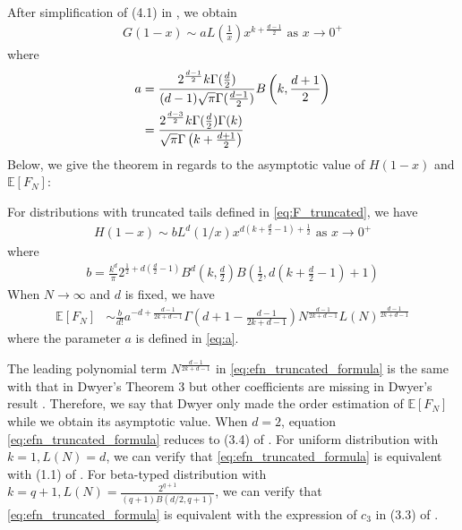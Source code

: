 \documentclass{aptpub}
\def\E{\mathbb{E}}
\begin{document}
After simplification of (4.1) in \cite{dwyer1991convex}, we obtain
\begin{align}
    G(1-x) \sim a
    L\left(\frac{1}{x} \right)
    x^{k+\frac{d-1}{2}} \textrm{ as } x \to 0^+ 
    \label{eq:truncated_G_1_x}
\end{align}
where
\begin{align}
a &=\frac{2^{\frac{d-1}{2}} k \Gamma(\frac{d}{2})}
    {(d-1) \sqrt{\pi} \Gamma(\frac{d-1}{2})}
    B\left(k, \frac{d+1}{2}\right) \notag \\
    &= \frac{2^{\frac{d-3}{2}} k \Gamma(\frac{d}{2})\Gamma(k)}
    {\sqrt{\pi} \Gamma\left(k+\frac{d+1}{2}\right)}
    \label{eq:a}
\end{align}
Below, we give the theorem in regards to the asymptotic value of $H(1-x)$ and $\E[F_N]$:
\begin{theorem}\label{thm:truncated_tails}
     For distributions with truncated tails
     defined in \eqref{eq:F_truncated},
     we have
\begin{align}
     H(1-x)  \sim b
     L^d(1/x) x^{d(k+\frac{d}{2}-1)+\frac{1}{2}} 
     \textrm{ as } x \to 0^+ \label{eq:truncated_H_1_x}
\end{align}
where
\begin{align}
     b =  \frac{k^d}{\pi}
     2^{\frac{1}{2} + d(\frac{d}{2}-1)} B^d\left(k, \frac{d}{2}\right)
     B\left( \frac{1}{2},
     d\left(k+\frac{d}{2} -1 \right)+1 \right)
     \label{eq:b}
 \end{align}
When $N\to \infty$ and $d$ is fixed, we have
 \begin{align}\label{eq:efn_truncated_formula}
     \E[F_N] &\sim \frac{b}{d!}a^{-d+\frac{d-1}{2k+d-1}}
     \Gamma 
     \left(d+1-\frac{d-1}{2k+d-1}\right)
     N^{\frac{d-1}{2k+d-1}}
     L(N)
     ^{\frac{d-1}{2k+d-1}}
 \end{align}
 where the parameter $a$ is defined in \eqref{eq:a}.
\end{theorem}
 The leading polynomial term $N^{\frac{d-1}{2k+d-1}}$ in \eqref{eq:efn_truncated_formula}
 is the same with that in Dwyer's Theorem 3
 but other coefficients are missing in Dwyer's result
 \cite{dwyer1991convex}. Therefore, we say that Dwyer only made the order estimation
 of $\E[F_N]$ while we obtain its asymptotic value.
 When $d=2$, equation \eqref{eq:efn_truncated_formula} reduces to (3.4) of \cite{carnal1970konvexe}.
 For uniform distribution with $k=1, L(N)=d$, we can verify that
 \eqref{eq:efn_truncated_formula} is equivalent with (1.1)
 of \cite{raynaud1970enveloppe}.
 For beta-typed distribution with $k=q+1, L(N)=\frac{2^{q+1}}{(q+1)B(d/2,q+1)}$,
 we can verify that
 \eqref{eq:efn_truncated_formula} is equivalent with the expression of $c_3$
 in (3.3) of \cite{affentranger1991convex}.
\end{document}
